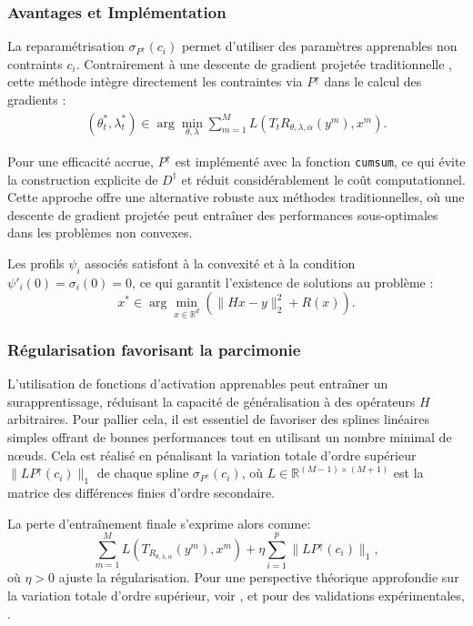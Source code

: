 \documentclass[a4paper, 12pt]{report} %
\begin{document}
\subsubsection{Avantages et Implémentation}

La reparamétrisation \( \sigma_{P^{\uparrow}}(c_i) \) permet d’utiliser des paramètres apprenables non contraints \( c_i \). Contrairement à une descente de gradient projetée traditionnelle \cite{kobler2017variational}, cette méthode intègre directement les contraintes via \( P^{\uparrow} \) dans le calcul des gradients :
\[
\begin{aligned}
(\theta^*_t, \lambda^*_t) \in \arg \min_{\theta, \lambda} \sum_{m=1}^M L \left( T_t R_{\theta, \lambda, \alpha}(y^m), x^m \right).
\end{aligned}
\]

Pour une efficacité accrue, \( P^{\uparrow} \) est implémenté avec la fonction \texttt{cumsum}, ce qui évite la construction explicite de \( D^{\dagger} \) et réduit considérablement le coût computationnel. Cette approche offre une alternative robuste aux méthodes traditionnelles, où une descente de gradient projetée peut entraîner des performances sous-optimales dans les problèmes non convexes.

Les profils \( \psi_i \) associés satisfont à la convexité et à la condition \( \psi'_i(0) = \sigma_i(0) = 0 \), ce qui garantit l’existence de solutions au problème :
\[
x^* \in \arg \min_{x \in \mathbb{R}^d} \left( \| Hx - y \|_2^2 + R(x) \right).
\]

\subsubsection{Régularisation favorisant la parcimonie}

L'utilisation de fonctions d'activation apprenables peut entraîner un surapprentissage, réduisant la capacité de généralisation à des opérateurs \( H \) arbitraires. Pour pallier cela, il est essentiel de favoriser des splines linéaires simples offrant de bonnes performances tout en utilisant un nombre minimal de nœuds. Cela est réalisé en pénalisant la variation totale d'ordre supérieur \( \| L P^{\uparrow}(c_i) \|_1 \) de chaque spline \( \sigma_{P^{\uparrow}}(c_i) \), où \( L \in \mathbb{R}^{(M-1) \times (M+1)} \) est la matrice des différences finies d'ordre secondaire.

La perte d'entraînement finale s'exprime alors comme:
\[
\sum_{m=1}^{M} L \left( T_{R_{\theta, \lambda, \alpha}}(y^m), x^m \right) + \eta \sum_{i=1}^{p} \| L P^{\uparrow}(c_i) \|_1,
\]
où \( \eta > 0 \) ajuste la régularisation. Pour une perspective théorique approfondie sur la variation totale d'ordre supérieur, voir \cite{unser2019representer}, et pour des validations expérimentales, \cite{bohra2020learning}.
\end{document}
